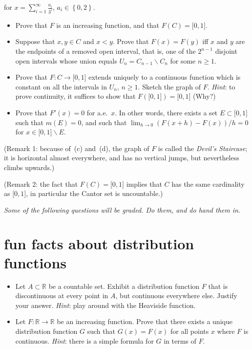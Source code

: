 for \(x = \sum_{i = 1}^{\infty}\frac{a_{i}}{3^{i}}\), \(a_{i} \in \left\{ {0,2} \right\}\).

\begin{itemize}
\item
  Prove that \(F\) is an increasing function, and that \(F(C) = \lbrack 0,1\rbrack\).
\item
  Suppose that \(x,y \in C\) and \(x < y\). Prove that \(F(x) = F(y)\) iff \(x\) and \(y\) are the endpoints of a removed open interval, that is, one of the \(2^{n - 1}\) disjoint open intervals whose union equals \(U_{n} = C_{n - 1}\backslash C_{n}\) for some \(n \geq 1\).
\item
  Prove that \(F:C\rightarrow\lbrack 0,1\rbrack\) extends uniquely to a continuous function which is constant on all the intervals in \(U_{n}\), \(n \geq 1\). Sketch the graph of \(F\). \emph{Hint}: to prove continuity, it suffices to show that \(F(\lbrack 0,1\rbrack) = \lbrack 0,1\rbrack\) (Why?)
\item
  Prove that \(F'(x) = 0\) for a.e.~\(x\). In other words, there exists a set \(E \subset \lbrack 0,1\rbrack\) such that \(m(E) = 0\), and such that \(\lim_{h\rightarrow 0}(F(x + h) - F(x))/h = 0\) for \(x \in \lbrack 0,1\rbrack\backslash E\).
\end{itemize}

(Remark 1: because of~(c) and~(d), the graph of \(F\) is called the \emph{Devil's Staircase}; it is horizontal almost everywhere, and has no vertical jumps, but nevertheless climbs upwards.)

(Remark 2: the fact that \(F(C) = \lbrack 0,1\rbrack\) implies that \(C\) has the same cardinality as \(\lbrack 0,1\rbrack\), in particular the Cantor set is uncountable.)

\emph{Some of the following questions will be graded. Do them, and do hand them in}.

\section{fun facts about distribution functions}\label{fun-facts-about-distribution-functions}

\begin{itemize}
\item
  Let \(A \subset \mathbb{R}\) be a countable set. Exhibit a distribution function \(F\) that is discontinuous at every point in \(A\), but continuous everywhere else. Justify your answer. \emph{Hint}: play around with the Heaviside function.
\item
  Let \(F:\mathbb{R}\rightarrow\mathbb{R}\) be an increasing function. Prove that there exists a unique distribution function \(G\) such that \(G(x) = F(x)\) for all points \(x\) where \(F\) is continuous. \emph{Hint}: there is a simple formula for \(G\) in terms of \(F\).
\end{itemize}

